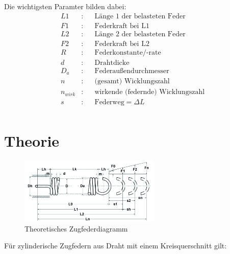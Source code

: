     Die wichtigsten Paramter bilden dabei:
    \begin{align*}
        L1 &:& &\text{Länge 1 der belasteten Feder}\\
        F1 &:& &\text{Federkraft bei L1}\\
        L2 &:& &\text{Länge 2 der belasteten Feder}\\
        F2 &:& &\text{Federkraft bei L2}\\
        R &:& &\text{Federkonstante/-rate}\\
        d &:& &\text{Drahtdicke}\\
        D_a &:& &\text{Federaußendurchmesser}\\
        n &:& &\text{(gesamt) Wicklungszahl}\\
        n_{wirk}&:& &\text{wirkende (federnde) Wicklungszahl}\\
        s &:& &\text{Federweg}=\Delta L \\
    \end{align*}
\label{sec:praxis}























\newpage
\section{Theorie}
\begin{figure}[H]
    \centering
    \includegraphics[width=0.6\textwidth]{bilder/Input/Zugfeder_technisch.jpg}
    \caption{Theoretisches Zugfederdiagramm \cite{AusM2}}
\end{figure}
Für zylinderische Zugfedern aus Draht mit einem Kreisquerschnitt gilt:\\\\

